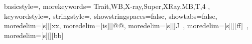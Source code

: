 \usepackage{listings}
\usepackage{subfiles}
\usepackage{textcomp}
\usepackage{xcolor}
\usepackage[ampersand]{easylist}

{
  basicstyle=\ttfamily,
  morekeywords={
  Trait,WB,X-ray,Super,XRay,MB,T,4
  },
  keywordstyle=\color{red},
  stringstyle=\color{red},
  showstringspaces=false,
  showtabs=false,
  moredelim=[s][\color{blue}]{x}{x},
  moredelim=[is][\color{violet}]{@}{@},
  moredelim=[s][\color{gray}]{J}{\ },
  moredelim=[s][\color{green}][ff]{\ },
  moredelim=[s][\color{green}][bb]{\ }
}